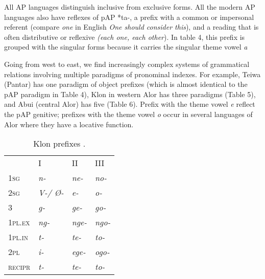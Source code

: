 All AP languages distinguish inclusive from exclusive forms. All the modern AP languages also have reflexes of pAP *ta-, a prefix with a common or impersonal referent (compare \textit{one} in English \textit{One should consider this}), and a reading that is often distributive or reflexive \textit{(each one, each other}). In table 4, this prefix is grouped with the singular forms because it carries the singular theme vowel \textit{a}

Going from west to east, we find increasingly complex systems of grammatical relations involving multiple paradigms of pronominal indexes. For example, Teiwa (Pantar) has one paradigm of object prefixes (which is almost identical to the pAP paradigm in Table 4), Klon in western Alor has three paradigms (Table 5), and Abui (central Alor) has five (Table 6). Prefix with the theme vowel \textit{e} reflect the pAP genitive;  prefixes with the theme vowel \textit{o} occur in several languages of Alor where they have a locative function.



\begin{table}\centering
\begin{tabular}{llll} & I & II & III\\
1\textsc{sg} & {\itshape n-} & {\itshape ne-} & {\itshape no-}\\
2\textsc{sg} & {\itshape V-/ {\O}-} & {\itshape e-} & {\itshape o-}\\
3 & {\itshape g-} & {\itshape ge-} & {\itshape go-}\\
{\scshape 1pl.ex} & {\itshape ng-} & {\itshape nge-} & {\itshape ngo-}\\
{\scshape 1pl.in} & {\itshape t-} & {\itshape te-} & {\itshape to-}\\
{\scshape 2pl} & {\itshape i-} & {\itshape ege-} & {\itshape ogo-}\\
{\scshape recipr} & {\itshape t-} & {\itshape te-} & {\itshape to-}\\
\end{tabular}
\caption{Klon prefixes \citep[69,39]{Baird2008}.}
\end{table}




